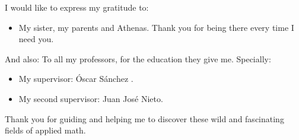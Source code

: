 
\cleardoublepage


\begin{acknowledgements}

I would like to express my gratitude to:
\begin{itemize}
	\item My sister, my parents and Athenas. Thank you for being there every time I need you.
\end{itemize}


And also: To all my professors, for the education they give me. Specially: 
\begin{itemize}
 \item My supervisor: Óscar Sánchez .
 \vspace*{3mm}
 \item My second supervisor: Juan José Nieto.
 \vspace*{3mm}
\end{itemize}
Thank you for guiding and helping me to discover these wild and fascinating fields of applied math.
\end{acknowledgements}
